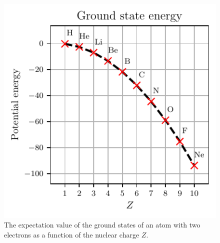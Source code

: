 \begin{figure}[ht]
    \centering
    \includegraphics{figs/energy_plot.pdf}
    \caption{The expectation value of the ground states of an atom with two electrons as a function of the nuclear charge $Z$.\label{fig:energy}}
\end{figure}
